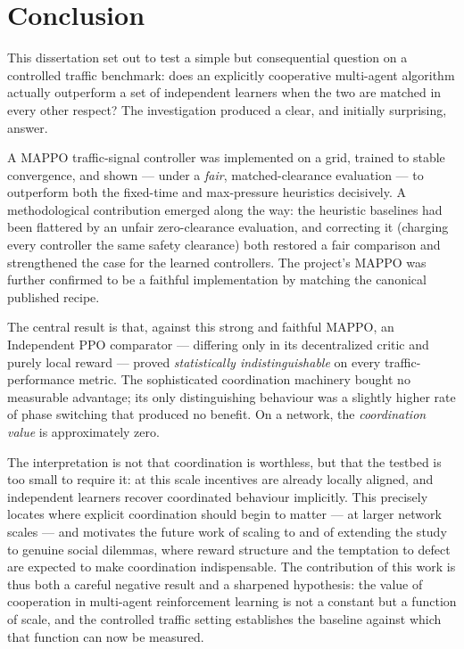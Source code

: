 \chapter{Conclusion}
\label{ch:conclusion}

This dissertation set out to test a simple but consequential question on a
controlled traffic benchmark: does an explicitly cooperative multi-agent algorithm
actually outperform a set of independent learners when the two are matched in every
other respect? The investigation produced a clear, and initially surprising, answer.

A MAPPO traffic-signal controller was implemented on a  grid, trained to
stable convergence, and shown --- under a \emph{fair}, matched-clearance evaluation ---
to outperform both the fixed-time and max-pressure heuristics decisively. A
methodological contribution emerged along the way: the heuristic baselines had been
flattered by an unfair zero-clearance evaluation, and correcting it (charging every
controller the same safety clearance) both restored a fair comparison and
strengthened the case for the learned controllers. The project's MAPPO was further
confirmed to be a faithful implementation by matching the canonical published
recipe.

The central result is that, against this strong and faithful MAPPO, an Independent
PPO comparator --- differing only in its decentralized critic and purely local
reward --- proved \emph{statistically indistinguishable} on every traffic-performance
metric. The sophisticated coordination machinery bought no measurable advantage; its
only distinguishing behaviour was a slightly higher rate of phase switching that
produced no benefit. On a  network, the \emph{coordination value} is
approximately zero.

The interpretation is not that coordination is worthless, but that the testbed is
too small to require it: at this scale incentives are already locally aligned, and
independent learners recover coordinated behaviour implicitly. This precisely
locates where explicit coordination should begin to matter --- at larger network
scales --- and motivates the future work of scaling to  and of extending the
study to genuine social dilemmas, where reward structure and the temptation to
defect are expected to make coordination indispensable. The contribution of this
work is thus both a careful negative result and a sharpened hypothesis: the value of
cooperation in multi-agent reinforcement learning is not a constant but a function
of scale, and the controlled traffic setting establishes the baseline against which
that function can now be measured.
